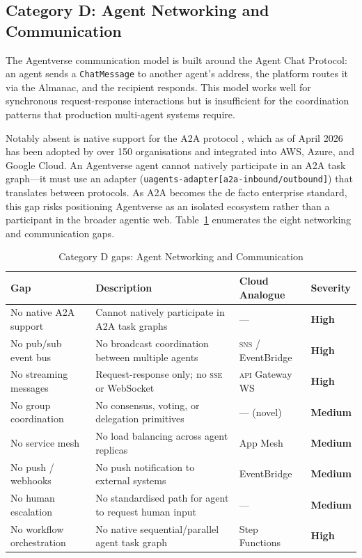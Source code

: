 \documentclass[twoside,11pt]{article}
\newcommand{\high}{\textcolor{red!70!black}{\textbf{High}}}
\newcommand{\medium}{\textcolor{orange!80!black}{\textbf{Medium}}}
\begin{document}
\subsection{Category D: Agent Networking and Communication}
\label{subsec:gap-networking}

The Agentverse communication model is built around the Agent Chat Protocol:
an agent sends a \texttt{ChatMessage} to another agent's address, the platform
routes it via the Almanac, and the recipient responds.  This model works well
for synchronous request-response interactions but is insufficient for the
coordination patterns that production multi-agent systems require.

Notably absent is native support for the A2A protocol \citep{a2a2026}, which
as of April 2026 has been adopted by over 150 organisations and integrated into
AWS, Azure, and Google Cloud.  An Agentverse agent cannot natively participate
in an A2A task graph---it must use an adapter
(\texttt{uagents-adapter[a2a-inbound/outbound]}) that translates between
protocols.  As A2A becomes the de facto enterprise standard, this gap risks
positioning Agentverse as an isolated ecosystem rather than a participant in
the broader agentic web.  Table~\ref{tab:gap-networking} enumerates the
eight networking and communication gaps.

\begin{table}[htbp]
\centering
\caption{Category D gaps: Agent Networking and Communication}
\label{tab:gap-networking}
\begin{tabular}{>{\raggedright\arraybackslash}p{3.2cm} >{\raggedright\arraybackslash}p{5.5cm} >{\raggedright\arraybackslash}p{2.9cm} l}
\toprule
\textbf{Gap} & \textbf{Description} & \textbf{Cloud Analogue} &
\textbf{Severity} \\
\midrule
No native A2A support & Cannot natively participate in A2A task graphs & --- &
\high \\
No pub/sub event bus & No broadcast coordination between multiple agents &
\textsc{sns} / EventBridge & \high \\
No streaming messages & Request-response only; no \textsc{sse} or WebSocket &
\textsc{api} Gateway WS & \high \\
No group coordination & No consensus, voting, or delegation primitives & ---
(novel) & \medium \\
No service mesh & No load balancing across agent replicas & App Mesh &
\medium \\
No push / webhooks & No push notification to external systems & EventBridge &
\medium \\
No human escalation & No standardised path for agent to request human input &
--- & \medium \\
No workflow orchestration & No native sequential/parallel agent task graph &
Step Functions & \high \\
\bottomrule
\end{tabular}
\end{table}
\end{document}
